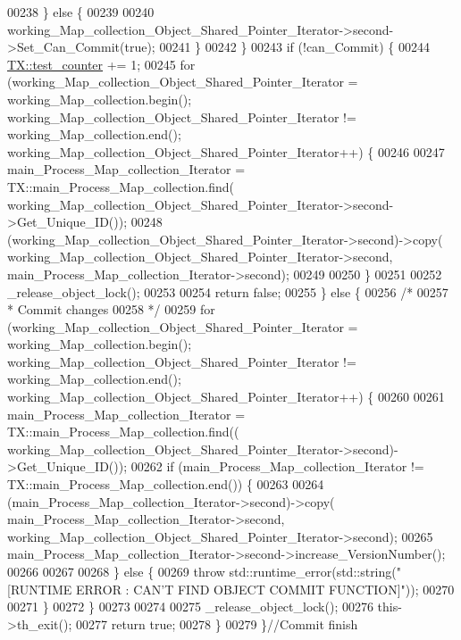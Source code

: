 \begin{DoxyCode}
00238         \} \textcolor{keywordflow}{else} \{
00239 
00240             working\_Map\_collection\_Object\_Shared\_Pointer\_Iterator->second->Set\_Can\_Commit(\textcolor{keyword}{true});
00241         \}
00242     \}
00243     \textcolor{keywordflow}{if} (!can\_Commit) \{
00244         \hyperlink{class_t_x_a25838234aab99ae891a90eb8623a8b3c}{TX::test\_counter} += 1;
00245         \textcolor{keywordflow}{for} (working\_Map\_collection\_Object\_Shared\_Pointer\_Iterator = working\_Map\_collection.begin(); 
      working\_Map\_collection\_Object\_Shared\_Pointer\_Iterator != working\_Map\_collection.end(); 
      working\_Map\_collection\_Object\_Shared\_Pointer\_Iterator++) \{
00246           
00247             main\_Process\_Map\_collection\_Iterator  = TX::main\_Process\_Map\_collection.find(
      working\_Map\_collection\_Object\_Shared\_Pointer\_Iterator->second->Get\_Unique\_ID());
00248             (working\_Map\_collection\_Object\_Shared\_Pointer\_Iterator->second)->copy(
      working\_Map\_collection\_Object\_Shared\_Pointer\_Iterator->second, main\_Process\_Map\_collection\_Iterator->second);
00249 
00250         \}
00251         
00252         \_release\_object\_lock();
00253 
00254         \textcolor{keywordflow}{return} \textcolor{keyword}{false};
00255     \} \textcolor{keywordflow}{else} \{
00256         \textcolor{comment}{/*}
00257 \textcolor{comment}{         * Commit changes
}
00258 \textcolor{comment}{         */}
00259         \textcolor{keywordflow}{for} (working\_Map\_collection\_Object\_Shared\_Pointer\_Iterator = working\_Map\_collection.begin(); 
      working\_Map\_collection\_Object\_Shared\_Pointer\_Iterator != working\_Map\_collection.end(); 
      working\_Map\_collection\_Object\_Shared\_Pointer\_Iterator++) \{
00260             
00261                 main\_Process\_Map\_collection\_Iterator = TX::main\_Process\_Map\_collection.find((
      working\_Map\_collection\_Object\_Shared\_Pointer\_Iterator->second)->Get\_Unique\_ID());
00262                 \textcolor{keywordflow}{if} (main\_Process\_Map\_collection\_Iterator != TX::main\_Process\_Map\_collection.end()) \{
00263 
00264                     (main\_Process\_Map\_collection\_Iterator->second)->copy(
      main\_Process\_Map\_collection\_Iterator->second, working\_Map\_collection\_Object\_Shared\_Pointer\_Iterator->second);
00265                     main\_Process\_Map\_collection\_Iterator->second->increase\_VersionNumber();
00266 
00267 
00268                 \} \textcolor{keywordflow}{else} \{
00269                     \textcolor{keywordflow}{throw} std::runtime\_error(std::string(\textcolor{stringliteral}{"[RUNTIME ERROR : CAN'T FIND OBJECT COMMIT
       FUNCTION]"}));
00270 
00271                 \}
00272         \}
00273 
00274 
00275         \_release\_object\_lock();
00276         this->th\_exit();
00277         \textcolor{keywordflow}{return} \textcolor{keyword}{true};
00278     \}
00279 \}\textcolor{comment}{//Commit finish}
\end{DoxyCode}


